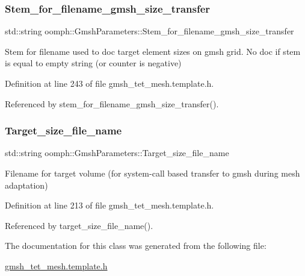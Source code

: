 \mbox{\label{classoomph_1_1GmshParameters_ad0151a908bc36fee2d955551b1da4016}} 
\subsubsection{\texorpdfstring{Stem\+\_\+for\+\_\+filename\+\_\+gmsh\+\_\+size\+\_\+transfer}{Stem\_for\_filename\_gmsh\_size\_transfer}}
{\footnotesize\ttfamily std\+::string oomph\+::\+Gmsh\+Parameters\+::\+Stem\+\_\+for\+\_\+filename\+\_\+gmsh\+\_\+size\+\_\+transfer\hspace{0.3cm}{\ttfamily [private]}}



Stem for filename used to doc target element sizes on gmsh grid. No doc if stem is equal to empty string (or counter is negative) 



Definition at line 243 of file gmsh\+\_\+tet\+\_\+mesh.\+template.\+h.



Referenced by stem\+\_\+for\+\_\+filename\+\_\+gmsh\+\_\+size\+\_\+transfer().

\mbox{\label{classoomph_1_1GmshParameters_ae2f3eabe211e22c18df2bf7b093bbdfb}} 
\subsubsection{\texorpdfstring{Target\+\_\+size\+\_\+file\+\_\+name}{Target\_size\_file\_name}}
{\footnotesize\ttfamily std\+::string oomph\+::\+Gmsh\+Parameters\+::\+Target\+\_\+size\+\_\+file\+\_\+name\hspace{0.3cm}{\ttfamily [private]}}



Filename for target volume (for system-\/call based transfer to gmsh during mesh adaptation) 



Definition at line 213 of file gmsh\+\_\+tet\+\_\+mesh.\+template.\+h.



Referenced by target\+\_\+size\+\_\+file\+\_\+name().



The documentation for this class was generated from the following file\+:\begin{DoxyCompactItemize}
\item 
\hyperlink{gmsh__tet__mesh_8template_8h}{gmsh\+\_\+tet\+\_\+mesh.\+template.\+h}\end{DoxyCompactItemize}
